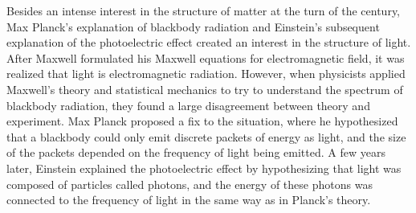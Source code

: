\documentclass[12pt, oneside, letterpaper, fleqn]{article}
\begin{document}
Besides an intense interest in the structure of matter at the turn of
the century, Max Planck's explanation of blackbody radiation and
Einstein's subsequent explanation of the photoelectric effect created an
interest in the structure of light. After Maxwell formulated his Maxwell
equations for electromagnetic field, it was realized that light is
electromagnetic radiation. However, when physicists applied Maxwell's
theory and statistical mechanics to try to understand the spectrum of
blackbody radiation, they found a large disagreement between theory and
experiment. Max Planck proposed a fix to the situation, where he
hypothesized that a blackbody could only emit discrete packets of energy
as light, and the size of the packets depended on the frequency of light
being emitted. A few years later, Einstein explained the photoelectric
effect by hypothesizing that light was composed of particles called
photons, and the energy of these photons was connected to the frequency
of light in the same way as in Planck's theory.

\nocite{*}
%


\end{document}
